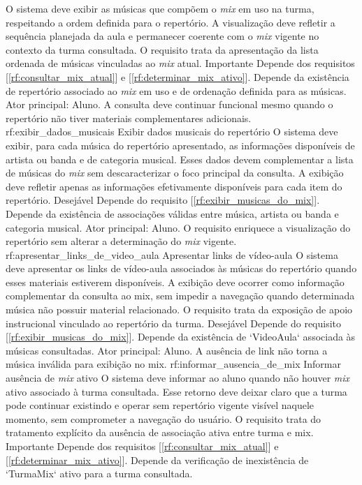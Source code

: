 {O sistema deve exibir as músicas que compõem o \textit{mix} em uso na turma, respeitando a ordem definida para o repertório. A visualização deve refletir a sequência planejada da aula e permanecer coerente com o \textit{mix} vigente no contexto da turma consultada. O requisito trata da apresentação da lista ordenada de músicas vinculadas ao \textit{mix} atual.}
{Importante}
{Depende dos requisitos [\ref{rf:consultar_mix_atual}] e [\ref{rf:determinar_mix_ativo}]. Depende da existência de repertório associado ao \textit{mix} em uso e de ordenação definida para as músicas.}
{Ator principal: Aluno. A consulta deve continuar funcional mesmo quando o repertório não tiver materiais complementares adicionais.}
\reqfuncfull
{rf:exibir_dados_musicais}
{Exibir dados musicais do repertório}
{O sistema deve exibir, para cada música do repertório apresentado, as informações disponíveis de artista ou banda e de categoria musical. Esses dados devem complementar a lista de músicas do \textit{mix} sem descaracterizar o foco principal da consulta. A exibição deve refletir apenas as informações efetivamente disponíveis para cada item do repertório.}
{Desejável}
{Depende do requisito [\ref{rf:exibir_musicas_do_mix}]. Depende da existência de associações válidas entre música, artista ou banda e categoria musical.}
{Ator principal: Aluno. O requisito enriquece a visualização do repertório sem alterar a determinação do \textit{mix} vigente.}
\reqfuncfull
{rf:apresentar_links_de_video_aula}
{Apresentar links de vídeo-aula}
{O sistema deve apresentar os links de vídeo-aula associados às músicas do repertório quando esses materiais estiverem disponíveis. A exibição deve ocorrer como informação complementar da consulta ao mix, sem impedir a navegação quando determinada música não possuir material relacionado. O requisito trata da exposição de apoio instrucional vinculado ao repertório da turma.}
{Desejável}
{Depende do requisito [\ref{rf:exibir_musicas_do_mix}]. Depende da existência de `VideoAula` associada às músicas consultadas.}
{Ator principal: Aluno. A ausência de link não torna a música inválida para exibição no mix.}
\reqfuncfull
{rf:informar_ausencia_de_mix}
{Informar ausência de \textit{mix} ativo}
{O sistema deve informar ao aluno quando não houver \textit{mix} ativo associado à turma consultada. Esse retorno deve deixar claro que a turma pode continuar existindo e operar sem repertório vigente visível naquele momento, sem comprometer a navegação do usuário. O requisito trata do tratamento explícito da ausência de associação ativa entre turma e mix.}
{Importante}
{Depende dos requisitos [\ref{rf:consultar_mix_atual}] e [\ref{rf:determinar_mix_ativo}]. Depende da verificação de inexistência de `TurmaMix` ativo para a turma consultada.}
